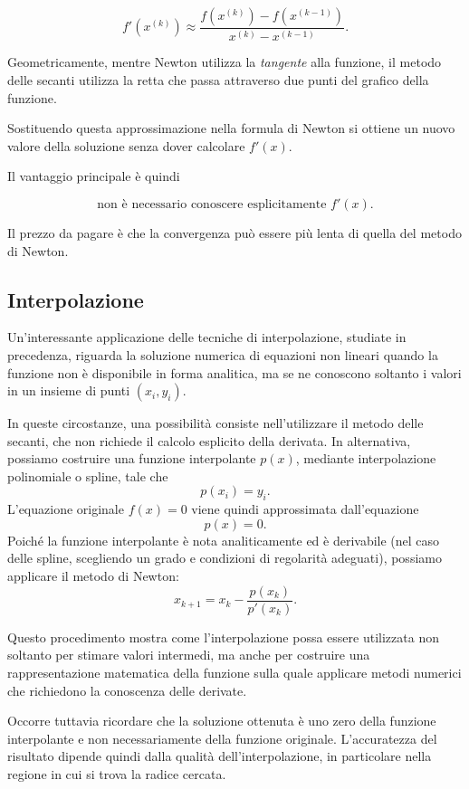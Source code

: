 \begin{equation*}
    f'(x^{(k)})
    \approx
    \frac{
        f(x^{(k)})-f(x^{(k-1)})
    }{
        x^{(k)}-x^{(k-1)}
    }.
\end{equation*}

Geometricamente, mentre Newton utilizza la \emph{tangente} alla
funzione, il metodo delle secanti utilizza la retta che passa
attraverso due punti del grafico della funzione.

Sostituendo questa approssimazione nella formula di Newton si
ottiene un nuovo valore della soluzione senza dover calcolare
$f'(x)$.

Il vantaggio principale è quindi

\begin{equation*}
\boxed{
\text{non è necessario conoscere esplicitamente }f'(x).
}
\end{equation*}

Il prezzo da pagare è che la convergenza può essere più lenta di
quella del metodo di Newton.

\subsection{Interpolazione}

Un'interessante applicazione delle tecniche di
interpolazione, studiate in precedenza, riguarda
la soluzione numerica di equazioni non lineari
quando la funzione non è disponibile in forma
analitica, ma se ne conoscono soltanto i valori
in un insieme di punti $(x_i,y_i)$.

In queste circostanze, una possibilità consiste
nell'utilizzare il metodo delle secanti, che
non richiede il calcolo esplicito della derivata.
In alternativa, possiamo costruire una funzione
interpolante $p(x)$, mediante interpolazione
polinomiale o spline, tale che
\[
p(x_i)=y_i.
\]
L'equazione originale $f(x)=0$ viene quindi
approssimata dall'equazione
\[
p(x)=0.
\]
Poiché la funzione interpolante è nota
analiticamente ed è derivabile (nel caso
delle spline, scegliendo un grado e condizioni
di regolarità adeguati), possiamo applicare
il metodo di Newton:
\[
x_{k+1}=x_k-\frac{p(x_k)}{p'(x_k)}.
\]

Questo procedimento mostra come
l'interpolazione possa essere utilizzata
non soltanto per stimare valori intermedi,
ma anche per costruire una rappresentazione
matematica della funzione sulla quale
applicare metodi numerici che richiedono
la conoscenza delle derivate.

Occorre tuttavia ricordare che la soluzione
ottenuta è uno zero della funzione interpolante
e non necessariamente della funzione originale.
L'accuratezza del risultato dipende quindi
dalla qualità dell'interpolazione,
in particolare nella regione in cui si trova
la radice cercata.

